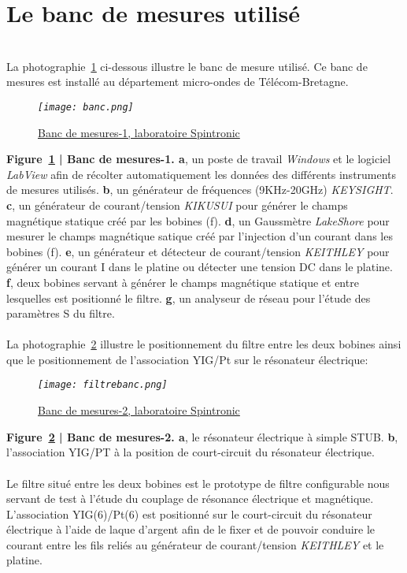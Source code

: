 \documentclass[12pt,fleqn]{book} %
\begin{document}
\section{Le banc de mesures utilisé}
~\\\noindent La photographie~\underline{\color{blue}\ref{banc}} ci-dessous illustre le banc de mesure utilisé. Ce banc de mesures est installé au département micro-ondes de Télécom-Bretagne.
\begin{figure}[H]
	\centering
	\itshape
	\texttt{[image: banc.png]}
	\caption{\label{banc} \underline{Banc de mesures-1, laboratoire Spintronic}}
\end{figure}
\noindent\footnotesize  \textbf{Figure~\underline{\color{blue}\ref{banc}} | Banc de mesures-1. a}, un poste de travail \emph{Windows} et le logiciel \emph{LabView} afin de récolter automatiquement les données des différents instruments de mesures utilisés. \textbf{b}, un générateur de fréquences (9KHz-20GHz) \emph{KEYSIGHT}. \textbf{c}, un générateur de courant/tension \emph{KIKUSUI} pour générer le champs magnétique statique créé par les bobines (f). \textbf{d}, un Gaussmètre \emph{LakeShore} pour mesurer le champs magnétique satique créé par l'injection d'un courant dans les bobines (f). \textbf{e}, un générateur et détecteur de courant/tension \emph{KEITHLEY} pour générer un courant I dans le platine ou détecter une tension DC dans le platine. \textbf{f}, deux bobines servant à générer le champs magnétique statique et entre lesquelles est positionné le filtre. \textbf{g}, un analyseur de réseau pour l'étude des paramètres S du filtre.  
~\\\\
\normalsize La photographie~\underline{\color{blue}\ref{filtrebanc}} illustre le positionnement du filtre entre les deux bobines ainsi que le positionnement de l'association YIG/Pt sur le résonateur électrique:
\begin{figure}[H]
	\centering
	\itshape
	\texttt{[image: filtrebanc.png]}
	\caption{\label{filtrebanc} \underline{Banc de mesures-2, laboratoire Spintronic}}
\end{figure}
\noindent\footnotesize  \textbf{Figure~\underline{\color{blue}\ref{filtrebanc}} | Banc de mesures-2. a}, le résonateur électrique à simple STUB. \textbf{b}, l'association YIG/PT à la position de court-circuit du résonateur électrique.
~\\\\
\normalsize Le filtre situé entre les deux bobines est le prototype de filtre configurable nous servant de test à l'étude du couplage de résonance électrique et magnétique. L'association YIG(\unit{6}{\micro\meter})/Pt(\unit{6}{\nano\meter}) est positionné sur le court-circuit du résonateur électrique à l'aide de laque d'argent afin de le fixer et de pouvoir conduire le courant entre les fils reliés au générateur de courant/tension \emph{KEITHLEY} et le platine.
\end{document}
